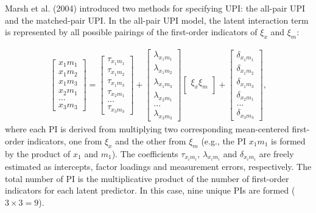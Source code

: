 \documentclass[
  man,mask]{apa6}
\begin{document}
Marsh et al. (2004) introduced two methods for specifying UPI: the all-pair UPI and the matched-pair UPI. In the all-pair UPI model, the latent interaction term is represented by all possible pairings of the first-order indicators of \(\xi_{x}\) and \(\xi_{m}\):

\begin{align}
    \begin{bmatrix}
        x_{1}m_{1} \\
        x_{1}m_{2} \\
        x_{1}m_{3} \\ 
        x_{2}m_{1} \\
        ... \\
        x_{3}m_{3}
    \end{bmatrix} = 
    \begin{bmatrix}
        \tau_{x_{1}m_{1}} \\
        \tau_{x_{1}m_{2}} \\ 
        \tau_{x_{1}m_{3}} \\ 
        \tau_{x_{2}m_{1}} \\ 
        ...\\
        \tau_{x_{3}m_{3}} 
    \end{bmatrix} +
    \begin{bmatrix}
        \lambda_{x_{1}m_{1}} \\
        \lambda_{x_{1}m_{2}} \\ 
        \lambda_{x_{1}m_{3}} \\ 
        \lambda_{x_{2}m_{1}} \\ 
        ...\\
        \lambda_{x_{3}m_{3}}
    \end{bmatrix}
    \begin{bmatrix}
        \xi_{x}\xi_{m} \\
    \end{bmatrix} +
    \begin{bmatrix}
        \delta_{x_{1}m_{1}} \\
        \delta_{x_{1}m_{2}} \\ 
        \delta_{x_{1}m_{3}} \\
        \delta_{x_{2}m_{1}} \\
        ... \\
        \delta_{x_{3}m_{3}}
    \end{bmatrix},
\end{align}
where each PI is derived from multiplying two corresponding mean-centered first-order indicators, one from \(\xi_{x}\) and the other from \(\xi_{m}\) (e.g., the PI \(x_{1}m_{1}\) is formed by the product of \(x_{1}\) and \(m_{1}\)). The coefficients \({\tau_{x_{i}m_{i}}}\), \({\lambda_{x_{i}m_{i}}}\) and \({\delta_{x_{i}m_{i}}}\) are freely estimated as intercepts, factor loadings and measurement errors, respectively. The total number of PI is the multiplicative product of the number of first-order indicators for each latent predictor. In this case, nine unique PIs are formed (\(3 \times 3 = 9\)).
\end{document}
